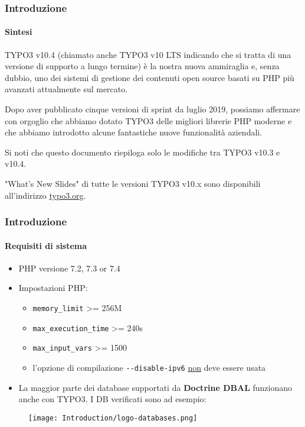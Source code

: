 \begin{frame}[fragile]
	\frametitle{Introduzione}
	\framesubtitle{Sintesi}

	\small
		TYPO3 v10.4 (chiamato anche TYPO3 v10 LTS indicando che si tratta di una versione di supporto
		a lungo termine) è la nostra nuova ammiraglia e, senza dubbio, uno dei sistemi di gestione dei
		contenuti open source basati su PHP più avanzati attualmente sul mercato.

		\vspace{0.2cm}

		Dopo aver pubblicato cinque versioni di sprint da luglio 2019, possiamo affermare con orgoglio
		che abbiamo dotato TYPO3 delle migliori librerie PHP moderne e che abbiamo introdotto alcune
		fantastiche nuove funzionalità aziendali.

		\vspace{0.2cm}

		Si noti che questo documento riepiloga solo le modifiche tra TYPO3 v10.3 e v10.4.

		\vspace{0.2cm}

		"What's New Slides" di tutte le versioni TYPO3 v10.x sono disponibili all'indirizzo
		\href{https://typo3.org/help/documentation/whats-new/}{typo3.org}.

	\normalsize

\end{frame}


\begin{frame}[fragile]
	\frametitle{Introduzione}
	\framesubtitle{Requisiti di sistema}

	\begin{itemize}
		\item PHP versione 7.2, 7.3 or 7.4
		\item Impostazioni PHP:

			\begin{itemize}
				\item \texttt{memory\_limit} >= 256M
				\item \texttt{max\_execution\_time} >= 240s
				\item \texttt{max\_input\_vars} >= 1500
				\item l'opzione di compilazione \texttt{-}\texttt{-disable-ipv6} \underline{non} deve essere usata
			\end{itemize}

		\item La maggior parte dei database supportati da \textbf{Doctrine DBAL} funzionano anche con TYPO3.
			I DB verificati sono ad esempio:
	\end{itemize}

	\begin{figure}
		\texttt{[image: Introduction/logo-databases.png]}
	\end{figure}

\end{frame}

